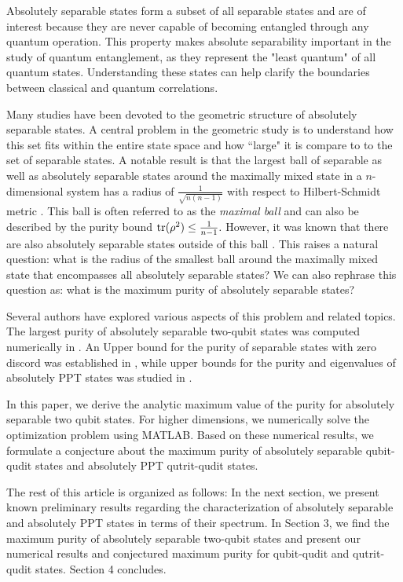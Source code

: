 \documentclass[reqno, 12pt,a4letter]{amsart}
\theoremstyle{definition}
\theoremstyle{plain}
\begin{document}
Absolutely separable states form a subset of all separable states and are of interest because they are never capable of becoming entangled through any quantum operation. This property makes absolute separability important in the study of quantum entanglement, as they represent the "least quantum" of all quantum states. Understanding these states can help clarify the boundaries between classical and quantum correlations.

Many studies have been devoted to the geometric structure of absolutely separable states. A central problem in the geometric study is to understand how this set fits within the entire state space and how ``large" it is compare to to the set of separable states. 
A notable result is that the largest ball of separable as well as absolutely separable states
around the maximally mixed state in a $n$-dimensional system has a radius of $\frac{1}{\sqrt{n(n-1)}}$ with respect to Hilbert-Schmidt metric \cite{Kus2001, Gurvits2002}. This ball is often referred to as the {\em maximal ball} and can also be described by the purity bound  ${\rm tr}(\rho^2)\le \frac{1}{n-1}.$ However, it was known that there are also absolutely separable states outside of this ball \cite{Kus2001}. This raises a natural question: what is the radius of the smallest ball around the maximally mixed state that encompasses all absolutely separable states? We can also rephrase this question as: what is the maximum purity of absolutely separable states?

Several authors have explored various aspects of this problem and related topics. The largest purity of absolutely separable two-qubit states was computed numerically in \cite{Slater2009}. An Upper bound for the purity of separable states with zero discord was established in \cite{Adhikari2021}, while  upper bounds for the purity and eigenvalues of absolutely PPT states was studied in \cite{Jivulescu2015,Filipop2017,Xiong2024}. 

In this paper, we derive the analytic maximum value of the purity for absolutely separable two qubit states. For higher dimensions, we numerically solve the optimization problem using MATLAB. Based on these numerical results, we formulate a conjecture about the maximum purity of absolutely separable qubit-qudit states and absolutely PPT qutrit-qudit states. 

The rest of this article is organized as follows: In the next section, we present known preliminary results regarding the characterization of absolutely separable and absolutely PPT states in terms of their spectrum. In Section 3, we find the maximum purity of absolutely separable two-qubit states and present our numerical results and conjectured maximum purity for qubit-qudit and qutrit-qudit states. Section 4 concludes.  
\end{document}
